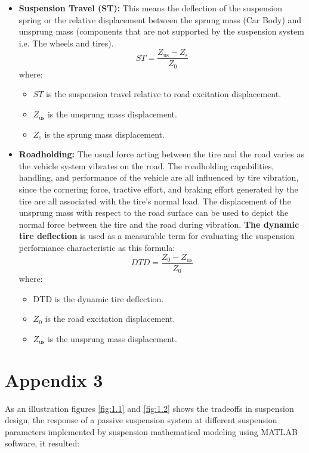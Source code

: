 \begin{itemize}
	\item \textbf{Suspension Travel (ST):} This means the deflection of the suspension spring or the relative displacement between the sprung mass (Car Body) and unsprung mass (components that are not supported by the suspension system i.e. The wheels and tires).
	\begin{equation}
		ST=\frac{Z_\text{us}-Z_\text{s}}{Z_\text{0}}
	\end{equation}
	where:
	\begin{itemize}[label=\textbullet]
		\item $ST$	is the suspension travel relative to road excitation displacement.
		\item $Z_\text{us}$	is the unsprung mass displacement.
		\item $Z_\text{s}$ is the sprung mass displacement.
	\end{itemize}
	\item \textbf{Roadholding:} The usual force acting between the tire and the road varies as the vehicle system vibrates on the road. The roadholding capabilities, handling, and performance of the vehicle are all influenced by tire vibration, since the cornering force, tractive effort, and braking effort generated by the tire are all associated with the tire's normal load. The displacement of the unsprung mass with respect to the road surface can be used to depict the normal force between the tire and the road during vibration. \textbf{The dynamic tire deflection} is used as a measurable term for evaluating the suspension performance characteristic as this formula:
	\begin{equation}
		DTD=\frac{Z_\text{0}-Z_\text{us}}{Z_\text{0}}
	\end{equation}
	where:
	\begin{itemize}[label=\textbullet]
		\item DTD is the dynamic tire deflection.
		\item $Z_\text{0}$ is the road excitation displacement.
		\item $Z_\text{us}$	is the unsprung mass displacement.
	\end{itemize}
\end{itemize}

\section{Appendix 3}
As an illustration figures \ref{fig:1.1} and \ref{fig:1.2} shows the tradeoffs in suspension design, the response of a passive suspension system at different suspension parameters implemented by suspension mathematical modeling using MATLAB software, it resulted:

